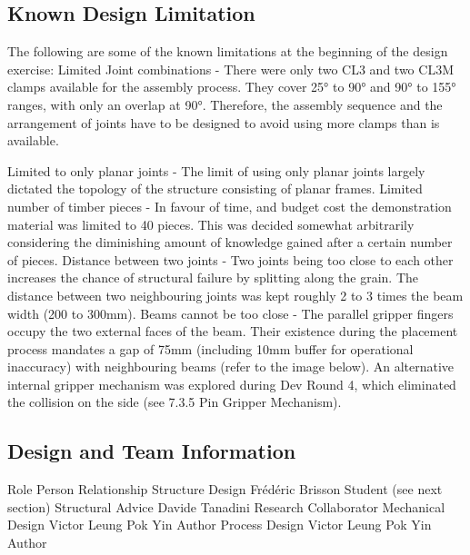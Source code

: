 \begin{itemize}
\begin{enumerate}
\subsection{Known Design Limitation}
The following are some of the known limitations at the beginning of the design exercise:
Limited Joint combinations - There were only two CL3 and two CL3M clamps available for the assembly process. They cover 25° to 90° and 90° to 155° ranges, with only an overlap at 90°. Therefore, the assembly sequence and the arrangement of joints have to be designed to avoid using more clamps than is available.

Limited to only planar joints - The limit of using only planar joints largely dictated the topology of the structure consisting of planar frames. 
Limited number of timber pieces - In favour of time, and budget cost the demonstration material was limited to 40 pieces. This was decided somewhat arbitrarily considering the diminishing amount of knowledge gained after a certain number of pieces.
Distance between two joints - Two joints being too close to each other increases the chance of structural failure by splitting along the grain. The distance between two neighbouring joints was kept roughly 2 to 3 times the beam width (200 to 300mm).
Beams cannot be too close - The parallel gripper fingers occupy the two external faces of the beam. Their existence during the placement process mandates a gap of 75mm (including 10mm buffer for operational inaccuracy) with neighbouring beams (refer to the image below). An alternative internal gripper mechanism was explored during Dev Round 4, which eliminated the collision on the side (see 7.3.5 Pin Gripper Mechanism).

\subsection{Design and Team Information}
Role
Person
Relationship
Structure Design
Frédéric Brisson
Student (see next section)
Structural Advice
Davide Tanadini
Research Collaborator
Mechanical Design
Victor Leung Pok Yin
Author
Process Design
Victor Leung Pok Yin
Author



\end{enumerate}
\end{itemize}
